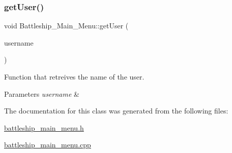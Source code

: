 \subsubsection{\texorpdfstring{get\+User()}{getUser()}}
{\footnotesize\ttfamily void Battleship\+\_\+\+Main\+\_\+\+Menu\+::get\+User (\begin{DoxyParamCaption}\item[{Q\+String}]{username }\end{DoxyParamCaption})}



Function that retreives the name of the user. 


\begin{DoxyParams}{Parameters}
{\em username} & \\
\hline
\end{DoxyParams}


The documentation for this class was generated from the following files\+:\begin{DoxyCompactItemize}
\item 
\hyperlink{battleship__main__menu_8h}{battleship\+\_\+main\+\_\+menu.\+h}\item 
\hyperlink{battleship__main__menu_8cpp}{battleship\+\_\+main\+\_\+menu.\+cpp}\end{DoxyCompactItemize}
